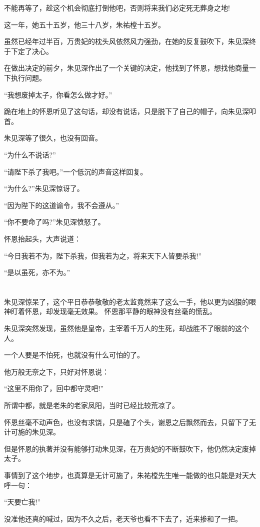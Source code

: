 \documentclass[11pt,a4paper,onecolumn]{article}
\begin{document}
不能再等了，趁这个机会彻底打倒他吧，否则将来我们必定死无葬身之地!

这一年，她五十五岁，他三十八岁，朱祐樘十五岁。

虽然已经年过半百，万贵妃的枕头风依然风力强劲，在她的反复鼓吹下，朱见深终于下定了决心。

在做出决定的前夕，朱见深作出了一个关键的决定，他找到了怀恩，想找他商量一下执行问题。

``我想废掉太子，你看怎么做才好。''

跪在地上的怀恩听见了这句话，却没有说话，只是脱下了自己的帽子，向朱见深叩首。

朱见深等了很久，也没有回音。

``为什么不说话?''

``请陛下杀了我吧。''一个低沉的声音这样回复。

``为什么?''朱见深惊讶了。

``因为陛下的这道谕令，我不会遵从。''

``你不要命了吗?''朱见深愤怒了。

怀恩抬起头，大声说道：

``今日我若不为，陛下杀我，但我若为之，将来天下人皆要杀我!''

``是以虽死，亦不为。''

\section[\thesection]{}

朱见深惊呆了，这个平日恭恭敬敬的老太监竟然来了这么一手，他以更为凶狠的眼神盯着怀恩，却发现毫无效果。
怀恩那平静的眼神没有丝毫的慌乱。

朱见深突然发现，虽然他是皇帝，主宰着千万人的生死，却战胜不了眼前的这个人。

一个人要是不怕死，也就没有什么可怕的了。

他万般无奈之下，只好对怀恩说：

``这里不用你了，回中都守灵吧!''

所谓中都，就是老朱的老家凤阳，当时已经比较荒凉了。

怀恩丝毫不动声色，也没有求饶，只是磕了个头，谢恩之后飘然而去，只留下了无计可施的朱见深。

但是怀恩的执著并没有能够打动朱见深，在万贵妃的不断鼓吹下，他仍然决定废掉太子。

事情到了这个地步，也真算是无计可施了，朱祐樘先生唯一能做的也只能是对天大呼一句：

``天要亡我!''

没准他还真的喊过，因为不久之后，老天爷也看不下去了，近来掺和了一把。
\end{document}
